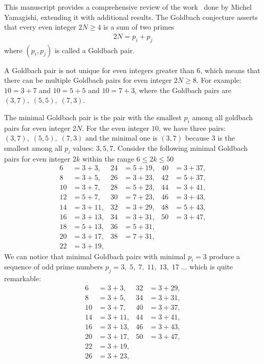 This manuscript provides a comprehensive review of the work~\cite{yamagishi2025goldbach} done by Michel Yamagishi,
extending it with additional results.
The Goldbach conjecture asserts that every even integer $2N \geq 4$ is a sum of two primes
\begin{align*}
    2N = p_i + p_j
\end{align*}
where $(p_i, p_j)$ is called a Goldbach pair.

A Goldbach pair is not unique for even integers greater than 6,
which means that there can be multiple Goldbach pairs for even integer $2N \geq 8$.
For example: $10=3+7$ and $10=5+5$ and $10=7+3$, where the Goldbach pairs are $(3,7), \; (5,5), \; (7,3)$.

The minimal Goldbach pair is the pair with the smallest $p_i$ among all goldbach pairs for even integer $2N$.
For the even integer $10$, we have three pairs: $(3,7), \; (5,5), \; (7,3)$
and the minimal one is $(3,7)$ because
$3$ is the smallest among all $p_i$ values: $3, 5, 7$.
Consider the following minimal Goldbach pairs for even integer $2k$ within the range $6 \leq 2k \leq 50$
\begin{align*}
    6  &= 3 + 3,   & 24 &= 5 + 19,  & 40 &= 3 + 37, \\
    8  &= 3 + 5,   & 26 &= 3 + 23,  & 42 &= 5 + 37, \\
    10 &= 3 + 7,   & 28 &= 5 + 23,  & 44 &= 3 + 41, \\
    12 &= 5 + 7,   & 30 &= 7 + 23,  & 46 &= 3 + 43, \\
    14 &= 3 + 11,  & 32 &= 3 + 29,  & 48 &= 5 + 43, \\
    16 &= 3 + 13,  & 34 &= 3 + 31,  & 50 &= 3 + 47, \\
    18 &= 5 + 13,  & 36 &= 5 + 31,  &             \\
    20 &= 3 + 17,  & 38 &= 7 + 31,  &             \\
    22 &= 3 + 19,  &               &
\end{align*}
We can notice that minimal Goldbach pairs with minimal $p_i=3$ produce a sequence of odd prime numbers
$p_j = 3, \; 5, \; 7, \; 11, \; 13, \; 17 \; \dots$ which is quite remarkable:
\begin{align*}
    6  &= 3 + 3,   & 32 &= 3 + 29, \\
    8  &= 3 + 5,   & 34 &= 3 + 31, \\
    10 &= 3 + 7,   & 40 &= 3 + 37, \\
    14 &= 3 + 11,  & 44 &= 3 + 41, \\
    16 &= 3 + 13,  & 46 &= 3 + 43, \\
    20 &= 3 + 17,  & 50 &= 3 + 47, \\
    22 &= 3 + 19,  &              \\
    26 &= 3 + 23,  &
\end{align*}
